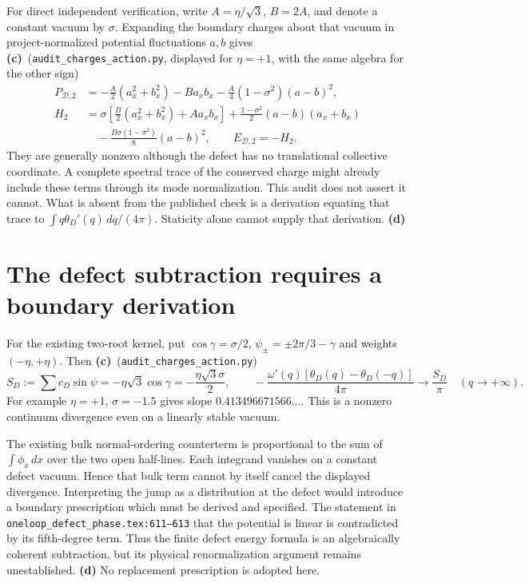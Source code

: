 \documentclass[11pt,a4paper]{article}
\newcommand{\Lc}{\textbf{(c)}}
\newcommand{\Ld}{\textbf{(d)}}
\newcommand{\scr}{\texttt{audit\_\allowbreak charges\_\allowbreak action.py}}
\begin{document}
For direct independent verification, write $A=\eta/\sqrt3$, $B=2A$,
and denote a constant vacuum by $\sigma$. Expanding the boundary charges
about that vacuum in project-normalized potential fluctuations
$a,b$ gives \Lc\ (\scr, displayed for $\eta=+1$, with the same algebra
for the other sign)
\begin{align}
 P_{\mathcal D,2}
 &=-\frac A2(a_x^2+b_x^2)-B a_xb_x
       -\frac A4(1-\sigma^2)(a-b)^2,\label{eq:P2}\\
 H_2&=\sigma\left[\frac B2(a_x^2+b_x^2)+A a_xb_x\right]
   +\frac{1-\sigma^2}{2}(a-b)(a_x+b_x)\nonumber\\
   &\quad-\frac{B\sigma(1-\sigma^2)}8(a-b)^2,
   \qquad E_{\mathcal D,2}=-H_2.
\end{align}
They are generally nonzero although the defect has no translational
collective coordinate. A complete spectral trace of the conserved charge
might already include these terms through its mode normalization. This audit
does not assert it cannot. What is absent from the published check is a
derivation equating that trace to $\int q\theta_D'(q)\,dq/(4\pi)$.
Staticity alone cannot supply that derivation. \Ld

\section{The defect subtraction requires a boundary derivation}
For the existing two-root kernel, put $\cos\gamma=\sigma/2$,
$\psi_\pm=\pm2\pi/3-\gamma$ and weights $(-\eta,+\eta)$.
Then \Lc\ (\scr)
\begin{equation}
 S_D:=\sum c_D\sin\psi=-\eta\sqrt3\cos\gamma
          =-\frac{\eta\sqrt3\sigma}{2},\qquad
 -\frac{\omega'(q)[\theta_D(q)-\theta_D(-q)]}{4\pi}
                 \longrightarrow\frac{S_D}{\pi}\quad(q\to+\infty).
\end{equation}
For example $\eta=+1$, $\sigma=-1.5$ gives slope
$0.413496671566\ldots$. This is a nonzero continuum divergence even on
a linearly stable vacuum.

The existing bulk normal-ordering counterterm is proportional to the sum of
$\int\phi_x\,dx$ over the two open half-lines. Each integrand vanishes
on a constant defect vacuum. Hence that bulk term cannot by itself cancel
the displayed divergence. Interpreting the jump as a distribution at the
defect would introduce a boundary prescription which must be derived and
specified. The statement in \texttt{oneloop\_defect\_phase.tex:611--613}
that the potential is linear is contradicted by its fifth-degree term.
Thus the finite defect energy formula is an algebraically coherent subtraction,
but its physical renormalization argument remains unestablished. \Ld
No replacement prescription is adopted here.
\end{document}

